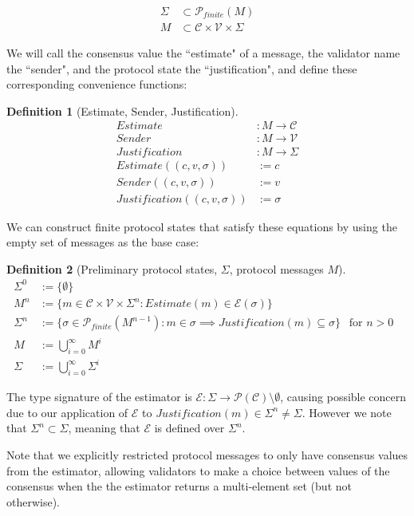 \documentclass{article}
\theoremstyle{definition}
\newtheorem{defn}{Definition}[section]
\begin{document}
\begin{align}
\Sigma &\subset \mathcal{P}_{finite}(M) \\
M &\subset \mathcal{C} \times \mathcal{V} \times \Sigma
\end{align}

We will call the consensus value the ``estimate" of a message, the validator name the ``sender", and the protocol state the ``justification", and define these corresponding convenience functions:

\begin{defn}[Estimate, Sender, Justification]
\begin{align}
Estimate&:M \to \mathcal{C} \\
Sender&:M \to \mathcal{V} \\
Justification&:M \to \Sigma \\
Estimate((c, v, \sigma)) &:= c \\
Sender((c, v, \sigma)) &:= v \\
Justification((c, v, \sigma)) &:= \sigma
\end{align}
\end{defn}

We can construct finite protocol states that satisfy these equations by using the empty set of messages as the base case:

\begin{defn}[Preliminary protocol states, $\Sigma$, protocol messages $M$]
\begin{align}
  \Sigma^0& := \{\emptyset\} \\
  M^n& := \{ m \in \mathcal{C} \times \mathcal{V} \times \Sigma^n: Estimate(m) \in \mathcal{E}(\sigma)\}\\
  \Sigma^n& := \{ \sigma \in \mathcal{P}_{finite}(M^{n-1}) : m \in \sigma \implies Justification(m) \subseteq \sigma \} ~ ~ \text{ for $n > 0$ } \\
  M& := \bigcup_{i = 0}^{\infty} M^i \\
  \Sigma& := \bigcup_{i = 0}^{\infty} \Sigma^i
\end{align}
\end{defn}

The type signature of the estimator is $\mathcal{E} : \Sigma \to \mathcal{P}(\mathcal{C}) \setminus \emptyset$, causing possible concern due to our application of $\mathcal{E}$ to $Justification(m) \in \Sigma^n \neq \Sigma$. However we note that $\Sigma^n \subset \Sigma$, meaning that $\mathcal{E}$ is defined over $\Sigma^n$.

Note that we explicitly restricted protocol messages to only have consensus values from the estimator, allowing validators to make a choice between values of the consensus when the the estimator returns a multi-element set (but not otherwise).
\end{document}
